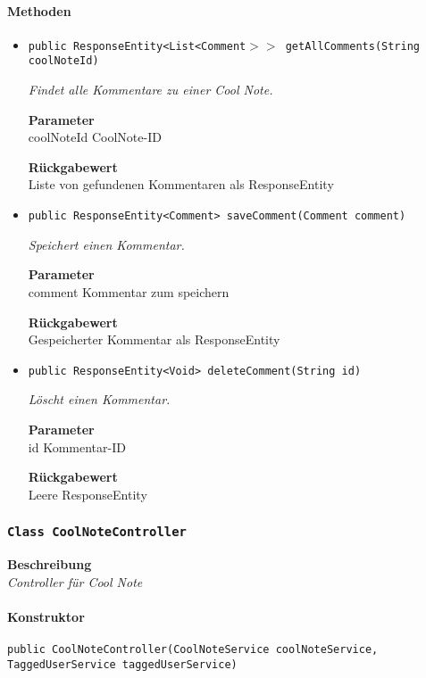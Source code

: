     \paragraph*{Methoden}
    \begin{itemize}
    	\item{\texttt{public ResponseEntity<List<Comment$>>$ getAllComments(String coolNoteId)}}
    	
    	\textit{Findet alle Kommentare zu einer Cool Note.}
    	
    	\textbf{Parameter} \\
    	coolNoteId CoolNote-ID
    	
    	\textbf{Rückgabewert} \\
    	Liste von gefundenen Kommentaren als ResponseEntity        \item{\texttt{public ResponseEntity<Comment> saveComment(Comment comment)}}
    	
    	\textit{Speichert einen Kommentar.}
    	
    	\textbf{Parameter} \\
    	comment Kommentar zum speichern
    	
    	\textbf{Rückgabewert} \\
    	Gespeicherter Kommentar als ResponseEntity        \item{\texttt{public ResponseEntity<Void> deleteComment(String id)}}
    	
    	\textit{Löscht einen Kommentar.}
    	
    	\textbf{Parameter} \\
    	id Kommentar-ID
    	
    	\textbf{Rückgabewert} \\
    	Leere ResponseEntity
    \end{itemize}
    \subsubsection{\texttt{Class CoolNoteController}}
    \textbf{Beschreibung} \\
    \textit{Controller für Cool Note}
    \paragraph*{Konstruktor}
    \texttt{public CoolNoteController(CoolNoteService coolNoteService, TaggedUserService taggedUserService)}
